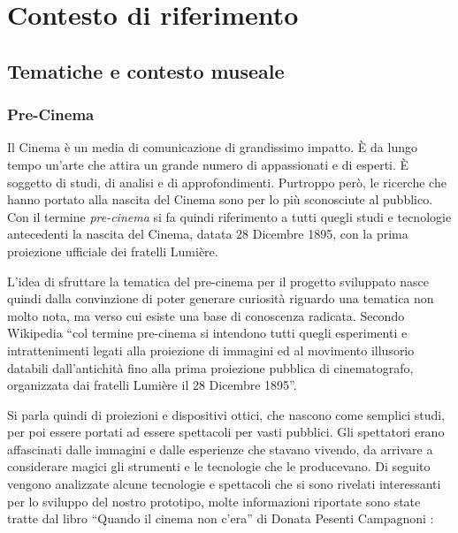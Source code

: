 \chapter {Contesto di riferimento}
\label{chap:contesto}

\section{Tematiche e contesto museale}
\label{sec:contesto_museale}

\subsection{Pre-Cinema}
\label{sec:precinema}

Il Cinema è un media di comunicazione di grandissimo impatto. È da lungo tempo un’arte che attira un grande numero di appassionati e di esperti. È soggetto di studi, di analisi e di approfondimenti.
Purtroppo però, le ricerche che hanno portato alla nascita del Cinema sono per lo più sconosciute al pubblico. 
Con il termine \textit{pre-cinema} si fa quindi riferimento a tutti quegli studi e tecnologie antecedenti la nascita del Cinema, datata 28 Dicembre 1895, con la prima proiezione ufficiale dei fratelli Lumière.

L’idea di sfruttare la tematica del pre-cinema per il progetto sviluppato nasce quindi dalla convinzione di poter generare curiosità riguardo una tematica non molto nota, ma verso cui esiste una base di conoscenza radicata.
Secondo Wikipedia \cite{precinema_wikipedia} “col termine pre-cinema si intendono tutti quegli esperimenti e intrattenimenti legati alla proiezione di immagini ed al movimento illusorio databili dall’antichità fino alla prima proiezione pubblica di cinematografo, organizzata dai fratelli Lumière il 28 Dicembre 1895”. 

Si parla quindi di proiezioni e dispositivi ottici, che nascono come semplici studi, per poi essere portati ad essere spettacoli per vasti pubblici. Gli spettatori erano affascinati dalle immagini e dalle esperienze che stavano vivendo, da arrivare a considerare magici gli strumenti e le tecnologie che le producevano.
Di seguito vengono analizzate alcune tecnologie e spettacoli che si sono rivelati interessanti per lo sviluppo del nostro prototipo, molte informazioni riportate sono state tratte dal libro “Quando il cinema non c’era” di Donata Pesenti Campagnoni \cite{quando_il_cinema_non_cera}:

